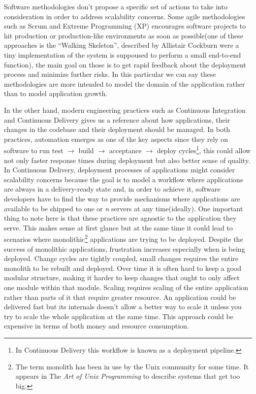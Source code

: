 \documentclass[10pt,article]{IEEEtran}
\begin{document}
Software methodologies don't propose a specific set of actions to take into consideration in order to address scalability concerns. Some agile methodologies such as Scrum and Extreme Programming (XP) encourages software projects to hit production or production-like environments as soon as possible(one of these approaches is the ``Walking Skeleton'', described by Allistair Cockburn\cite{cockburn} were a tiny implementation of the system is suppoused to perform a small end-to-end function), the main goal on those is to get rapid feedback about the deployment process and minimize further risks. In this particular we can say these methodologies are more intended to model the domain of the application rather than to model application growth.

In the other hand, modern engineering practices such as Continuous Integration and Continuous Delivery gives us a reference about how applications, their changes in the codebase and their deployment should be managed. In both practices, automation emerges as one of the key aspects since they rely on software to run test $\to$ build $\to$ acceptance $\to$ deploy cycles\footnote{In Continuous Delivery this workflow is known as a deployment pipeline.}, this could allow not only faster response times during deployment but also better sense of quality\cite{humble}. In Continuous Delivery, deployment processes of applications might consider scalability concerns because the goal is to model a workflow where applications are always in a delivery-ready state and, in order to achieve it, software developers have to find the way to provide mechanisms where applications are available to be shipped to one or \textit{n} servers at any time(ideally).
One important thing to note here is that these practices are agnostic to the application they serve. This makes sense at first glance but at the same time it could lead to scenarios where monolithic\footnote{The term monolith has been in use by the Unix community for some time. It appears in The \emph{Art of Unix Programming} to describe systems that get too big.} applications are trying to be deployed. Despite the success of monolithic applications, frustration increases especially when is being deployed. Change cycles are tightly coupled, small changes requires the entire monolith to be rebuilt and deployed. Over time it is often hard to keep a good modular structure, making it harder to keep changes that ought to only affect one module within that module. Scaling requires scaling of the entire application rather than parts of it that require greater resource\cite{monolit:fowler}. An application could be delivered fast but its internals doesn't allow a better way to scale it unless you try to scale the whole application at the same time. This approach could be expensive in terms of both money and resource consumption. 
\end{document}
